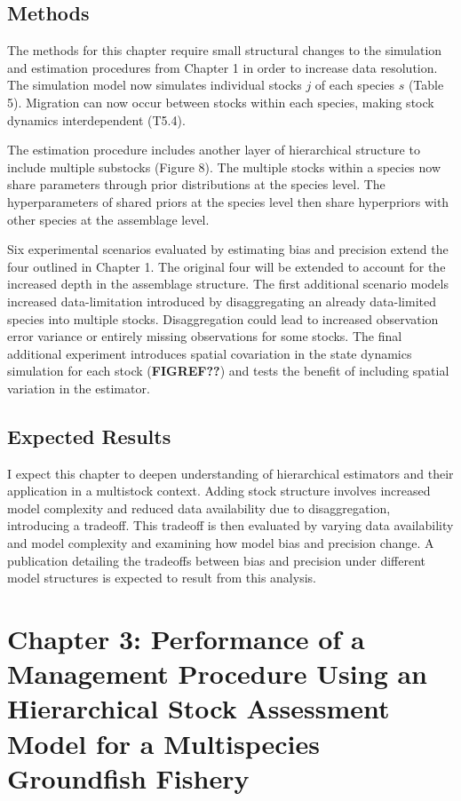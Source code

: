 \documentclass[12pt,]{scrartcl}
\begin{document}
\subsection{Methods}\label{methods-1}

The methods for this chapter require small structural changes to the
simulation and estimation procedures from Chapter 1 in order to increase
data resolution. The simulation model now simulates individual stocks
\(j\) of each species \(s\) (Table 5). Migration can now occur between
stocks within each species, making stock dynamics interdependent (T5.4).

The estimation procedure includes another layer of hierarchical
structure to include multiple substocks (Figure 8). The multiple stocks
within a species now share parameters through prior distributions at the
species level. The hyperparameters of shared priors at the species level
then share hyperpriors with other species at the assemblage level.

Six experimental scenarios evaluated by estimating bias and precision
extend the four outlined in Chapter 1. The original four will be
extended to account for the increased depth in the assemblage structure.
The first additional scenario models increased data-limitation
introduced by disaggregating an already data-limited species into
multiple stocks. Disaggregation could lead to increased observation
error variance or entirely missing observations for some stocks. The
final additional experiment introduces spatial covariation in the state
dynamics simulation for each stock (\textbf{FIGREF??}) and tests the
benefit of including spatial variation in the estimator.

\subsection{Expected Results}\label{expected-results-1}

I expect this chapter to deepen understanding of hierarchical estimators
and their application in a multistock context. Adding stock structure
involves increased model complexity and reduced data availability due to
disaggregation, introducing a tradeoff. This tradeoff is then evaluated
by varying data availability and model complexity and examining how
model bias and precision change. A publication detailing the tradeoffs
between bias and precision under different model structures is expected
to result from this analysis.

\section{Chapter 3: Performance of a Management Procedure Using an
Hierarchical Stock Assessment Model for a Multispecies Groundfish
Fishery}\label{chapter-3-performance-of-a-management-procedure-using-an-hierarchical-stock-assessment-model-for-a-multispecies-groundfish-fishery}
\end{document}
